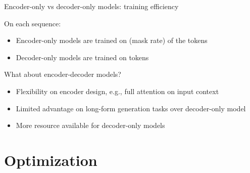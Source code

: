 \documentclass[usenames,dvipsnames,notes,11pt,aspectratio=169,hyperref={colorlinks=true, linkcolor=blue}]{beamer}
\begin{document}
\begin{frame}
    {Encoder-only vs decoder-only models: training efficiency}

    On each sequence: 
    \begin{itemize}
        \item Encoder-only models are trained on  (mask rate) of the tokens
        \item Decoder-only models are trained on  tokens 
    \end{itemize}

    \pause
    What about encoder-decoder models?
    \begin{itemize}
        \item Flexibility on encoder design, e.g., full attention on input context
        \item Limited advantage on long-form generation tasks over decoder-only model 
        \item More resource available for decoder-only models 
    \end{itemize}
\end{frame}

%
%

\section{Optimization}
\end{document}
